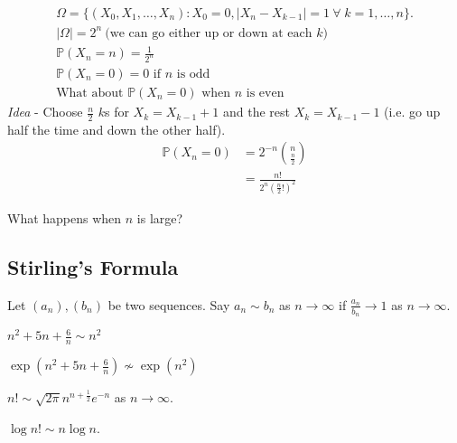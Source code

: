 \begin{gather*}
    \Omega = \{(X_0, X_1, \dots, X_n) : X_0 = 0, |X_n - X_{k - 1}| = 1 \ \forall \; k = 1, \dots, n\}. \\
    |\Omega| = 2^n \ \text{(we can go either up or down at each $k$)} \\
    \mathbb{P}(X_n = n) = \frac{1}{2^n} \\
    \mathbb{P}(X_n = 0) = 0 \text{ if $n$ is odd} \\
    \text{What about } \mathbb{P}(X_n = 0) \text{ when $n$ is even}
\end{gather*} 
\emph{Idea} - Choose $\frac{n}{2}$ $k$s for $X_k = X_{k - 1} + 1$ and the rest $X_k = X_{k-1} - 1$ (i.e. go up half the time and down the other half).
\begin{align*}
    \mathbb{P}(X_n = 0) &= 2^{-n} \binom{n}{\frac{n}{2}} \\
    &= \frac{n!}{2^n \left(\frac{n}{2}! \right)^2}
\end{align*} 

\begin{question}
    What happens when $n$ is large?
\end{question} 

\subsection{Stirling's Formula}

\begin{notation}
    Let $(a_n), (b_n)$ be two sequences.
    Say $a_n \sim b_n$ as $n \to \infty$ if $\frac{a_n}{b_n} \to 1$ as $n \to \infty$.
\end{notation} 

\begin{example}
    $n^2 + 5n + \frac{6}{n} \sim n^2$
\end{example} 

\begin{example}
    $\exp \left( n^2 + 5n + \frac{6}{n} \right) \nsim \exp(n^2)$
\end{example} 

\begin{theorem}[Stirling]
    $n! \sim \sqrt{2 \pi} n^{n + \frac{1}{2}} e^{-n}$ as $n \to \infty$.
\end{theorem} 

\begin{theorem}
    $\log n! \sim n \log n$.
\end{theorem} 


